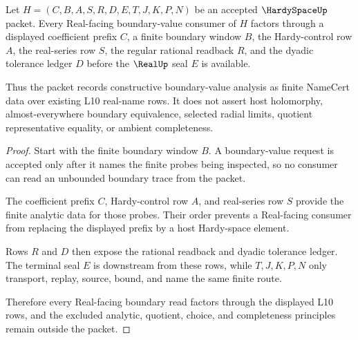 \begin{theorem}
\label{thm:hardy-space-real-boundary}
Let $H=(C,B,A,S,R,D,E,T,J,K,P,N)$ be an accepted $\HardySpaceUp$ packet. Every Real-facing boundary-value consumer of $H$ factors through a displayed coefficient prefix $C$, a finite boundary window $B$, the Hardy-control row $A$, the real-series row $S$, the regular rational readback $R$, and the dyadic tolerance ledger $D$ before the $\RealUp$ seal $E$ is available.

Thus the packet records constructive boundary-value analysis as finite NameCert data over existing L10 real-name rows. It does not assert host holomorphy, almost-everywhere boundary equivalence, selected radial limits, quotient representative equality, or ambient completeness.
\end{theorem}
\begin{proof}
Start with the finite boundary window $B$. A boundary-value request is accepted only after it names the finite probes being inspected, so no consumer can read an unbounded boundary trace from the packet.

The coefficient prefix $C$, Hardy-control row $A$, and real-series row $S$ provide the finite analytic data for those probes. Their order prevents a Real-facing consumer from replacing the displayed prefix by a host Hardy-space element.

Rows $R$ and $D$ then expose the rational readback and dyadic tolerance ledger. The terminal seal $E$ is downstream from these rows, while $T,J,K,P,N$ only transport, replay, source, bound, and name the same finite route.

Therefore every Real-facing boundary read factors through the displayed L10 rows, and the excluded analytic, quotient, choice, and completeness principles remain outside the packet.
\end{proof}



